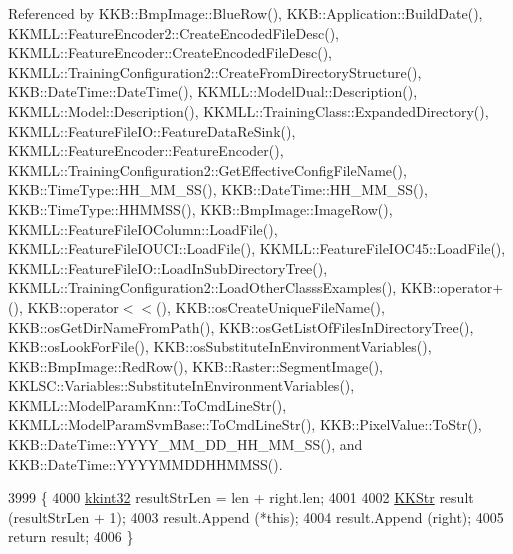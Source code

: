 Referenced by K\+K\+B\+::\+Bmp\+Image\+::\+Blue\+Row(), K\+K\+B\+::\+Application\+::\+Build\+Date(), K\+K\+M\+L\+L\+::\+Feature\+Encoder2\+::\+Create\+Encoded\+File\+Desc(), K\+K\+M\+L\+L\+::\+Feature\+Encoder\+::\+Create\+Encoded\+File\+Desc(), K\+K\+M\+L\+L\+::\+Training\+Configuration2\+::\+Create\+From\+Directory\+Structure(), K\+K\+B\+::\+Date\+Time\+::\+Date\+Time(), K\+K\+M\+L\+L\+::\+Model\+Dual\+::\+Description(), K\+K\+M\+L\+L\+::\+Model\+::\+Description(), K\+K\+M\+L\+L\+::\+Training\+Class\+::\+Expanded\+Directory(), K\+K\+M\+L\+L\+::\+Feature\+File\+I\+O\+::\+Feature\+Data\+Re\+Sink(), K\+K\+M\+L\+L\+::\+Feature\+Encoder\+::\+Feature\+Encoder(), K\+K\+M\+L\+L\+::\+Training\+Configuration2\+::\+Get\+Effective\+Config\+File\+Name(), K\+K\+B\+::\+Time\+Type\+::\+H\+H\+\_\+\+M\+M\+\_\+\+S\+S(), K\+K\+B\+::\+Date\+Time\+::\+H\+H\+\_\+\+M\+M\+\_\+\+S\+S(), K\+K\+B\+::\+Time\+Type\+::\+H\+H\+M\+M\+S\+S(), K\+K\+B\+::\+Bmp\+Image\+::\+Image\+Row(), K\+K\+M\+L\+L\+::\+Feature\+File\+I\+O\+Column\+::\+Load\+File(), K\+K\+M\+L\+L\+::\+Feature\+File\+I\+O\+U\+C\+I\+::\+Load\+File(), K\+K\+M\+L\+L\+::\+Feature\+File\+I\+O\+C45\+::\+Load\+File(), K\+K\+M\+L\+L\+::\+Feature\+File\+I\+O\+::\+Load\+In\+Sub\+Directory\+Tree(), K\+K\+M\+L\+L\+::\+Training\+Configuration2\+::\+Load\+Other\+Classs\+Examples(), K\+K\+B\+::operator+(), K\+K\+B\+::operator$<$$<$(), K\+K\+B\+::os\+Create\+Unique\+File\+Name(), K\+K\+B\+::os\+Get\+Dir\+Name\+From\+Path(), K\+K\+B\+::os\+Get\+List\+Of\+Files\+In\+Directory\+Tree(), K\+K\+B\+::os\+Look\+For\+File(), K\+K\+B\+::os\+Substitute\+In\+Environment\+Variables(), K\+K\+B\+::\+Bmp\+Image\+::\+Red\+Row(), K\+K\+B\+::\+Raster\+::\+Segment\+Image(), K\+K\+L\+S\+C\+::\+Variables\+::\+Substitute\+In\+Environment\+Variables(), K\+K\+M\+L\+L\+::\+Model\+Param\+Knn\+::\+To\+Cmd\+Line\+Str(), K\+K\+M\+L\+L\+::\+Model\+Param\+Svm\+Base\+::\+To\+Cmd\+Line\+Str(), K\+K\+B\+::\+Pixel\+Value\+::\+To\+Str(), K\+K\+B\+::\+Date\+Time\+::\+Y\+Y\+Y\+Y\+\_\+\+M\+M\+\_\+\+D\+D\+\_\+\+H\+H\+\_\+\+M\+M\+\_\+\+S\+S(), and K\+K\+B\+::\+Date\+Time\+::\+Y\+Y\+Y\+Y\+M\+M\+D\+D\+H\+H\+M\+M\+S\+S().


\begin{DoxyCode}
3999 \{
4000   \hyperlink{namespace_k_k_b_a8fa4952cc84fda1de4bec1fbdd8d5b1b}{kkint32}  resultStrLen = len + right.len;
4001 
4002   \hyperlink{class_k_k_b_1_1_k_k_str}{KKStr}  result (resultStrLen + 1);
4003   result.Append (*\textcolor{keyword}{this});
4004   result.Append (right);
4005   \textcolor{keywordflow}{return}  result;
4006 \}
\end{DoxyCode}
